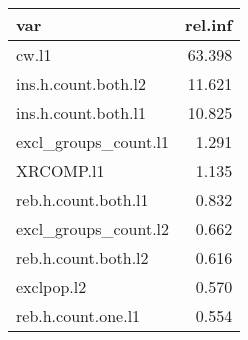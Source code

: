 \begin{tabular}{lr}
  \hline
var & rel.inf \\ 
  \hline
cw.l1 & 63.398 \\ 
  ins.h.count.both.l2 & 11.621 \\ 
  ins.h.count.both.l1 & 10.825 \\ 
  excl\_groups\_count.l1 & 1.291 \\ 
  XRCOMP.l1 & 1.135 \\ 
  reb.h.count.both.l1 & 0.832 \\ 
  excl\_groups\_count.l2 & 0.662 \\ 
  reb.h.count.both.l2 & 0.616 \\ 
  exclpop.l2 & 0.570 \\ 
  reb.h.count.one.l1 & 0.554 \\ 
   \hline
\end{tabular}

